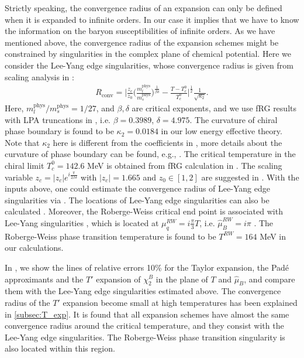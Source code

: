 \documentclass[%
reprint,
superscriptaddress,
preprintnumbers,
amsmath,amssymb,
aps,
prd,
]{revtex4-2}
\def\Fig#1{\Cref{#1}}
\begin{document}
Strictly speaking, the convergence radius of an expansion can only be defined when it is expanded to infinite orders. In our case it implies that we have to know the information on the baryon susceptibilities of infinite orders. As we have mentioned above, the convergence radius of the expansion schemes might be constrained by singularities in the complex plane of chemical potential. Here we consider the Lee-Yang edge singularities, whose convergence radius is given from scaling analysis in \cite{Mukherjee:2019eou}:
\begin{align}
R_{\text{conv}}=\bigg |\frac{z_c}{z_0} \bigg(\frac{m_l^{\text{phys}}}{m_s^{\text{phys}}}\bigg)^\frac{1}{\beta\delta} -\frac{T-T_c^0}{T_c^0}\bigg |^{\frac{1}{2}} \frac{1}{\sqrt{\kappa_2}}.\label{eq:conver-LY}
\end{align}
Here, $m_l^{\text{phys}}/m_s^{\text{phys}}=1/27$, and $\beta,\delta$ are critical exponents, and we use fRG results with LPA truncations in \cite{Chen:2021iuo}, i.e. $\beta= 0.3989$, $\delta=4.975$. The curvature of chiral phase boundary is found to be $\kappa_2=0.0184$ in our low energy effective theory. Note that $\kappa_2$ here is different from the coefficients in , more details about the curvature of phase boundary can be found, e.g., \cite{Fu:2019hdw, Fu:2021oaw}. The critical temperature in the chiral limit $T_c^0=142.6$ MeV is obtained from fRG calculation in \cite{Braun:2023qak}. The scaling variable $z_c=|z_c|e^{i \frac{\pi}{2 \beta\delta}}$ with $|z_c|=1.665$ and $z_0\in[1,2]$ are suggested in \cite{Mukherjee:2019eou}. With the inputs above, one could estimate the convergence radius of Lee-Yang edge singularities via . The locations of Lee-Yang edge singularities can also be calculated \cite{Mukherjee:2021tyg, Wan:2024xeu}. Moreover, the Roberge-Weiss critical end point is associated with Lee-Yang singularities \cite{Clarke:2023noy, Guenther:2022wcr}, which is located at $\mu_q^{RW}=i \frac{\pi}{3}T$, i.e. $\hat \mu_B^{RW}=i\pi$ \cite{Braun:2009gm, Sun:2018ozp}. The Roberge-Weiss phase transition temperature is found to be $T^{RW}=164$ MeV in our calculations.

In \Fig{fig:Rconv}, we show the lines of relative errors 10\% for the Taylor expansion, the Pad\'e approximants and the $T'$ expansion of $\chi_2^B$ in the plane of $T$ and $\hat \mu_B$, and compare them with the Lee-Yang edge singularities estimated above. The convergence radius of the $T'$ expansion become small at high temperatures has been explained in \cref{subsec:T_exp}. It is found that all expansion schemes have almost the same convergence radius around the critical temperature, and they consist with the Lee-Yang edge singularities. The Roberge-Weiss phase transition singularity is also located within this region.
\end{document}

